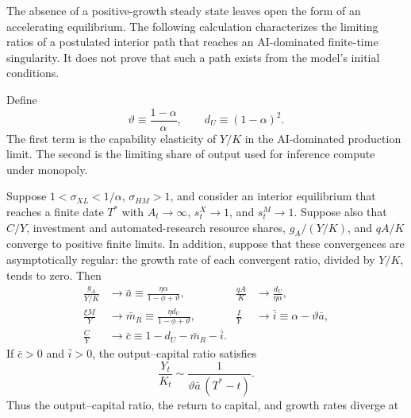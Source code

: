 The absence of a positive-growth steady state leaves open the form of an accelerating
equilibrium. The following calculation characterizes the limiting ratios of a
postulated interior path that reaches an AI-dominated finite-time singularity. It
does not prove that such a path exists from the model's initial conditions.

Define
\begin{equation}
    \vartheta\equiv\frac{1-\alpha}{\alpha},
    \qquad
    d_U\equiv(1-\alpha)^2.
    \label{eq:high-sigma-singular-definitions}
\end{equation}
The first term is the capability elasticity of $Y/K$ in the AI-dominated
production limit. The second is the limiting share of output used for inference
compute under monopoly.

\begin{conditionalresult}
\label{cond:high-sigma-singular-scaling}
Suppose $1<\sigma_{XL}<1/\alpha$, $\sigma_{HM}>1$, and consider an interior
equilibrium that reaches a finite date $T^*$ with $A_t\to\infty$,
$s^X_t\to1$, and $s^M_t\to1$. Suppose also that $C/Y$, investment and
automated-research resource shares, $g_A/(Y/K)$, and $qA/K$ converge to positive
finite limits. In addition, suppose that these convergences are asymptotically
regular: the growth rate of each convergent ratio, divided by $Y/K$, tends to zero.
Then
\begin{align}
    \frac{g_A}{Y/K}
    &\longrightarrow
    \bar a
    \equiv
    \frac{\eta\alpha}{1-\phi+\vartheta},
    &
    \frac{qA}{K}
    &\longrightarrow
    \frac{d_U}{\eta\alpha},
    \label{eq:high-sigma-singular-a-q}\\
    \frac{\xi M}{Y}
    &\longrightarrow
    \bar m_R
    \equiv
    \frac{\eta d_U}{1-\phi+\vartheta},
    &
    \frac{I}{Y}
    &\longrightarrow
    \bar i
    \equiv
    \alpha-\vartheta\bar a,
    \label{eq:high-sigma-singular-resource-shares}\\
    \frac{C}{Y}
    &\longrightarrow
    \bar c
    \equiv
    1-d_U-\bar m_R-\bar i.
    \label{eq:high-sigma-singular-consumption-share}
\end{align}
If $\bar c>0$ and $\bar i>0$, the output--capital ratio satisfies
\begin{equation}
    \frac{Y_t}{K_t}
    \sim
    \frac{1}{\vartheta\bar a\,(T^*-t)}.
    \label{eq:high-sigma-time-to-singularity}
\end{equation}
Thus the output--capital ratio, the return to capital, and growth rates diverge at

\end{conditionalresult}
